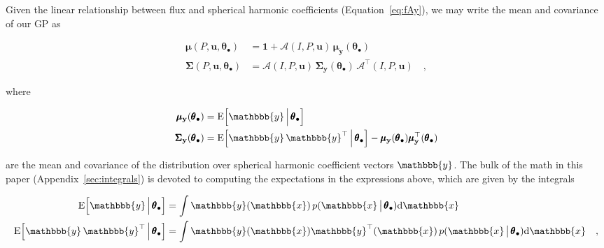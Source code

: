 \documentclass[modern,linenumbers]{aastex62}
\begin{document}
%
Given the linear relationship between flux and spherical harmonic
coefficients (Equation~\ref{eq:fAy}),
we may write the mean and covariance of our GP as
%
\begin{linenomath}\begin{align}
        \label{eq:mean_f}
        \pmb{\mu}(P, \mathbf{u}, \pmb{\theta}_\bullet)
         & = \mathbf{1} + \pmb{\mathcal{A}}(I, P, \mathbf{u}) \, \pmb{\mu}_{\mathbf{y}}(\pmb{\theta}_\bullet)
        \\
        \label{eq:cov_f}
        \pmb{\Sigma}(P, \mathbf{u}, \pmb{\theta}_\bullet)
         & = \pmb{\mathcal{A}}(I, P, \mathbf{u}) \, \pmb{\Sigma}_{\mathbf{y}}(\pmb{\theta}_\bullet) \, \pmb{\mathcal{A}}^\top(I, P, \mathbf{u})
        \quad,
    \end{align}\end{linenomath}
%
where
%
\begin{linenomath}\begin{align}
        \label{eq:mean_y}
        \pmb{\mu}_{\mathbf{y}}(\pmb{\theta}_\bullet)
         & = \mathrm{E} \Big[ \mathbbb{y} \, \Big| \, \pmb{\theta}_\bullet \Big]
        \\
        \label{eq:cov_y}
        \pmb{\Sigma}_{\mathbf{y}}(\pmb{\theta}_\bullet)
         & = \mathrm{E} \Big[ \mathbbb{y} \, \mathbbb{y}^\top \, \Big| \, \pmb{\theta}_\bullet \Big] - \pmb{\mu}_{\mathbf{y}}(\pmb{\theta}_\bullet) \pmb{\mu}_{\mathbf{y}}^\top(\pmb{\theta}_\bullet)
    \end{align}\end{linenomath}
%
are the mean and covariance of the distribution over spherical harmonic coefficient
vectors $\mathbbb{y}$.
The bulk of the math in this paper (Appendix~\ref{sec:integrals})
is devoted to computing
the expectations in the expressions above, which
are given by the integrals
%
\begin{linenomath}\begin{align}
        \label{eq:exp_y}
        \mathrm{E} \Big[ \mathbbb{y} \, \Big| \, \pmb{\theta}_\bullet \Big]
         & =
        \int \mathbbb{y}(\mathbbb{x} ) \, p(\mathbbb{x} \, \big| \, \pmb{\theta}_\bullet)\mathrm{d}\mathbbb{x}
        \\
        \label{eq:exp_yy}
        \mathrm{E} \Big[ \mathbbb{y} \, \mathbbb{y}^\top \, \Big| \, \pmb{\theta}_\bullet \Big]
         & =
        \int \mathbbb{y}(\mathbbb{x} ) \mathbbb{y}^\top(\mathbbb{x} ) \, p(\mathbbb{x} \, \big| \, \pmb{\theta}_\bullet)\mathrm{d}\mathbbb{x}
        \quad,
    \end{align}\end{linenomath}
\end{document}
